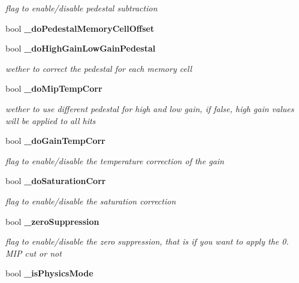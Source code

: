 \begin{DoxyCompactItemize}
\begin{DoxyCompactList}\small\item\em flag to enable/disable pedestal subtraction \end{DoxyCompactList}\item 
bool {\bfseries \-\_\-do\-Pedestal\-Memory\-Cell\-Offset}\label{classCALICE_1_1Ahc2CalibrateProcessor_a91d4d566f70258fbf36cfcc7949e3971}

\item 
bool {\bf \-\_\-do\-High\-Gain\-Low\-Gain\-Pedestal}\label{classCALICE_1_1Ahc2CalibrateProcessor_a51aac1d9a2195810ab61ae74fd1e2812}

\begin{DoxyCompactList}\small\item\em wether to correct the pedestal for each memory cell \end{DoxyCompactList}\item 
bool {\bf \-\_\-do\-Mip\-Temp\-Corr}
\begin{DoxyCompactList}\small\item\em wether to use different pedestal for high and low gain, if false, high gain values will be applied to all hits \end{DoxyCompactList}\item 
bool {\bf \-\_\-do\-Gain\-Temp\-Corr}\label{classCALICE_1_1Ahc2CalibrateProcessor_a3d46c30741845b340de59f9b5fd5de40}

\begin{DoxyCompactList}\small\item\em flag to enable/disable the temperature correction of the gain \end{DoxyCompactList}\item 
bool {\bf \-\_\-do\-Saturation\-Corr}\label{classCALICE_1_1Ahc2CalibrateProcessor_a40d7fce6e7e82cb810b6c0a7e016a74d}

\begin{DoxyCompactList}\small\item\em flag to enable/disable the saturation correction \end{DoxyCompactList}\item 
bool {\bf \-\_\-zero\-Suppression}\label{classCALICE_1_1Ahc2CalibrateProcessor_a6498f3913e1c29ca1903001108e5fc23}

\begin{DoxyCompactList}\small\item\em flag to enable/disable the zero suppression, that is if you want to apply the 0. M\-I\-P cut or not \end{DoxyCompactList}\item 
bool {\bf \-\_\-is\-Physics\-Mode}\label{classCALICE_1_1Ahc2CalibrateProcessor_a2d753d78ae5426ff61005e48040ad22c}


\end{DoxyCompactItemize}
